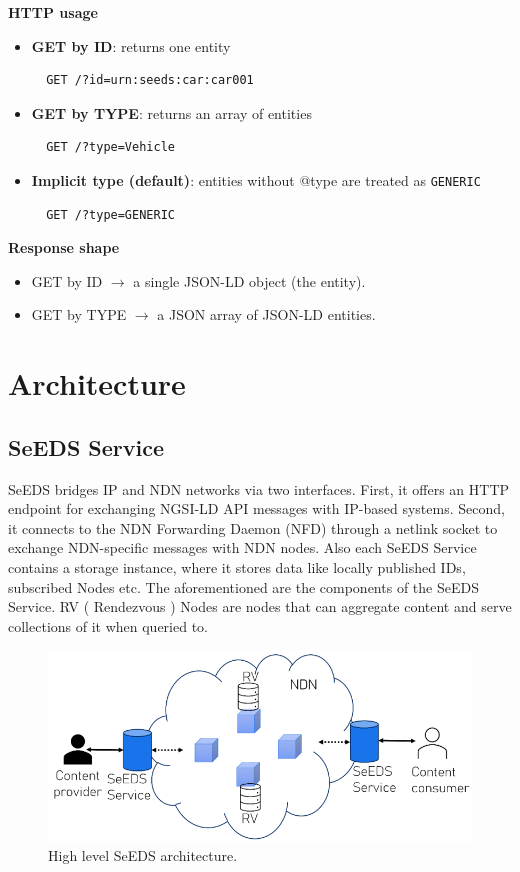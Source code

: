 \documentclass{article}
\begin{document}
\noindent\textbf{HTTP usage}
\begin{itemize}
  \item \textbf{GET by ID}: returns one entity
  \begin{verbatim}
  GET /?id=urn:seeds:car:car001
  \end{verbatim}

  \item \textbf{GET by TYPE}: returns an array of entities
  \begin{verbatim}
  GET /?type=Vehicle
  \end{verbatim}

  \item \textbf{Implicit type (default)}: entities without @type are treated as
  \texttt{GENERIC}
  \begin{verbatim}
  GET /?type=GENERIC
  \end{verbatim}
\end{itemize}

\noindent\textbf{Response shape}
\begin{itemize}
  \item GET by ID $\rightarrow$ a single JSON-LD object (the entity).
  \item GET by TYPE $\rightarrow$ a JSON array of JSON-LD entities.
\end{itemize}

\section{Architecture}

\subsection{SeEDS Service}

SeEDS bridges IP and NDN networks via two interfaces. First, it offers an
HTTP endpoint for exchanging NGSI-LD API messages with IP-based systems.
Second, it connects to the NDN Forwarding Daemon (NFD) through a netlink
socket to exchange NDN-specific messages with NDN nodes. Also each SeEDS Service contains a storage instance, where it stores data like locally published IDs, subscribed Nodes etc. The aforementioned are the components of the SeEDS Service. RV ( Rendezvous ) Nodes are nodes that can aggregate content and serve collections of it when queried to.

\begin{figure}[H]
    \centering
    \includegraphics[width=0.8\linewidth]{images/seeds_architecture.png}
    \caption{High level SeEDS architecture.}
    \label{fig:seeds_architecture}
\end{figure}
\end{document}
